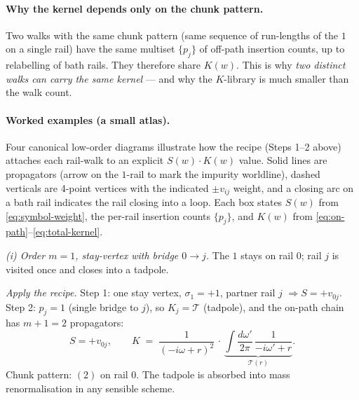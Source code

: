 \documentclass[11pt,a4paper]{article}
\begin{document}
\paragraph{Why the kernel depends only on the chunk pattern.}
Two walks with the same chunk pattern (same sequence of run-lengths of
the $1$ on a single rail) have the same multiset $\{p_{j}\}$ of
off-path insertion counts, up to relabelling of bath rails. They
therefore share $K(w)$. This is why \emph{two distinct walks can carry
the same kernel} --- and why the $K$-library is much smaller than the
walk count.

\paragraph{Worked examples (a small atlas).}
Four canonical low-order diagrams illustrate how the recipe
(Steps 1--2 above) attaches each rail-walk to an explicit
$S(w)\!\cdot\!K(w)$ value. Solid lines are propagators (arrow on
the $1$-rail to mark the impurity worldline), dashed verticals are
4-point vertices with the indicated $\pm v_{ij}$ weight, and a closing
arc on a bath rail indicates the rail closing into a loop. Each box
states $S(w)$ from \eqref{eq:symbol-weight}, the per-rail insertion
counts $\{p_{j}\}$, and $K(w)$ from
\eqref{eq:on-path}--\eqref{eq:total-kernel}.

\medskip
\textit{(i) Order $m{=}1$, stay-vertex with bridge $0\!\to\!j$.}
The $1$ stays on rail $0$; rail $j$ is visited once and closes into a
tadpole.
\begin{center}
\end{center}
\textit{Apply the recipe.}
\;Step 1: one stay vertex, $\sigma_{1}{=}+1$, partner rail $j$
$\Rightarrow S = +v_{0j}$.
\;Step 2: $p_{j}{=}1$ (single bridge to $j$), so $K_{j}=\mathcal T$
(tadpole), and the on-path chain has $m{+}1{=}2$ propagators:
\[
S = +v_{0j},\qquad
K \;=\; \frac{1}{(-i\omega+r)^{2}}\,\cdot\,
\underbrace{\int\!\frac{d\omega'}{2\pi}\,\frac{1}{-i\omega'+r}}_{\mathcal T(r)}.
\]
Chunk pattern: $(2)$ on rail $0$. The tadpole is absorbed into
mass renormalisation in any sensible scheme.
\end{document}
